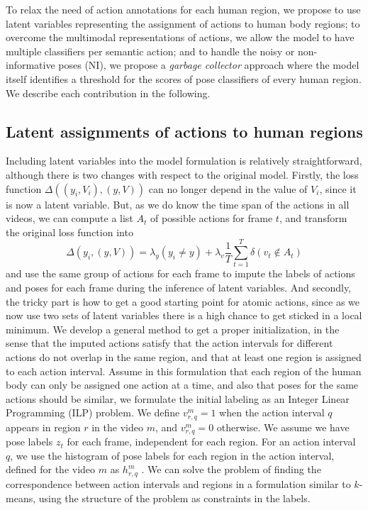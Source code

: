 To relax the need of action annotations for each human region, we propose to use latent variables representing the assignment of actions to human body regions; to overcome the multimodal representations of actions, we allow the model to have multiple classifiers per semantic action; and to handle the noisy or non-informative poses (NI), we propose a \emph{garbage collector} approach where the model itself identifies a threshold for the scores of pose classifiers of every human region. We describe each contribution in the following.


\subsection{Latent assignments of actions to human regions}

Including latent variables into the model formulation is relatively straightforward, although there is two changes with respect to the original model. Firstly, the loss function $\Delta((y_i,V_i),(y,V))$ can no longer depend in the value of $V_i$, since it is now a latent variable. But, as we do know the time span of the actions in all videos, we can compute a list $A_t$ of possible actions for frame $t$, and transform the original loss function into
\begin{equation}
\Delta(y_i,(y,V)) = \lambda_y(y_i \ne y) + \lambda_v\frac{1}{T}\sum_{t=1}^T \delta(v_t \notin A_t)
\end{equation}
and use the same group of actions for each frame to impute the labels of actions and poses for each frame during the inference of latent variables. And secondly, the tricky part is how to get a good starting point for atomic actions, since as we now use two sets of latent variables there is a high chance to get sticked in a local minimum. We develop a general method to get a proper initialization, in the sense that the imputed actions satisfy that the action intervals for different actions do not overlap in the same region, and that at least one region is assigned to each action interval. Assume in this formulation that each region of the human body can only be assigned one action at a time, and also that poses for the same actions should be similar, we formulate the initial labeling as an Integer Linear Programming (ILP) problem. We define $v_{r,q}^m=1$ when the action interval $q$ appears in region $r$ in the video $m$, and $v_{r,q}^m=0$ otherwise. We assume we have pose labels $z_t$ for each frame, independent for each region. For an action interval $q$, we use the histogram of pose labels for each region in the action interval, defined for the video $m$ as $h_{r,q}^m$ . We can solve the problem of finding the correspondence between action intervals and regions in a formulation similar to $k$-means, using the structure of the problem as constraints in the labels. 
